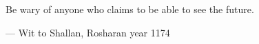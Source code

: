 \begin{flushright}
\begin{hangleftquote}{\QENOpen}{\QENClose}
Be wary of anyone who claims to be able to see the future.
\end{hangleftquote}
\par\smallskip
\normalfont — Wit to Shallan, Rosharan year 1174
\end{flushright}
